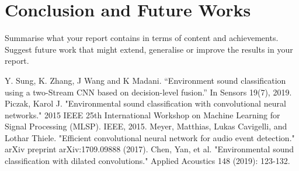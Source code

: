 \documentclass[conference]{IEEEtran}
\begin{document}
\section{Conclusion and Future Works}
Summarise what your report contains in terms of content and achievements. 
Suggest future work that might extend, generalise or improve the results in your report. 







\begin{thebibliography}{00}
 Y. Sung, K. Zhang, J Wang and K Madani. ``Environment sound classification using a two-Stream CNN based on decision-level fusion.'' In Sensors 19(7), 2019.
Piczak, Karol J. "Environmental sound classification with convolutional neural networks." 2015 IEEE 25th International Workshop on Machine Learning for Signal Processing (MLSP). IEEE, 2015.
 Meyer, Matthias, Lukas Cavigelli, and Lothar Thiele. "Efficient convolutional neural network for audio event detection." arXiv preprint arXiv:1709.09888 (2017).
 Chen, Yan, et al. "Environmental sound classification with dilated convolutions." Applied Acoustics 148 (2019): 123-132.
\end{thebibliography}
\end{document}
